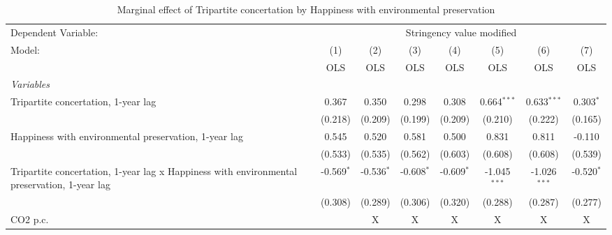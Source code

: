 
\begin{table}[htbp]
   \caption{Marginal effect of Tripartite concertation by Happiness with environmental preservation}
   \centering
   \begin{tabular}{lccccccc}
      \toprule
      Dependent Variable: & \multicolumn{7}{c}{Stringency value modified}\\
      Model:                                                                                      & (1)          & (2)          & (3)          & (4)          & (5)            & (6)            & (7)\\  
                                                                                                  &  OLS         & OLS          & OLS          & OLS          & OLS            & OLS            & OLS\\  
      \midrule
      \emph{Variables}\\
      Tripartite concertation, 1-year lag                                                         & 0.367        & 0.350        & 0.298        & 0.308        & 0.664$^{***}$  & 0.633$^{***}$  & 0.303$^{*}$\\   
                                                                                                  & (0.218)      & (0.209)      & (0.199)      & (0.209)      & (0.210)        & (0.222)        & (0.165)\\   
      Happiness with environmental preservation, 1-year lag                                       & 0.545        & 0.520        & 0.581        & 0.500        & 0.831          & 0.811          & -0.110\\   
                                                                                                  & (0.533)      & (0.535)      & (0.562)      & (0.603)      & (0.608)        & (0.608)        & (0.539)\\   
      Tripartite concertation, 1-year lag x Happiness with environmental preservation, 1-year lag & -0.569$^{*}$ & -0.536$^{*}$ & -0.608$^{*}$ & -0.609$^{*}$ & -1.045$^{***}$ & -1.026$^{***}$ & -0.520$^{*}$\\   
                                                                                                  & (0.308)      & (0.289)      & (0.306)      & (0.320)      & (0.288)        & (0.287)        & (0.277)\\   
      CO2 p.c.                                                                                    &              & X            & X            & X            & X              & X              & X\\  

\end{tabular}
\end{table}
